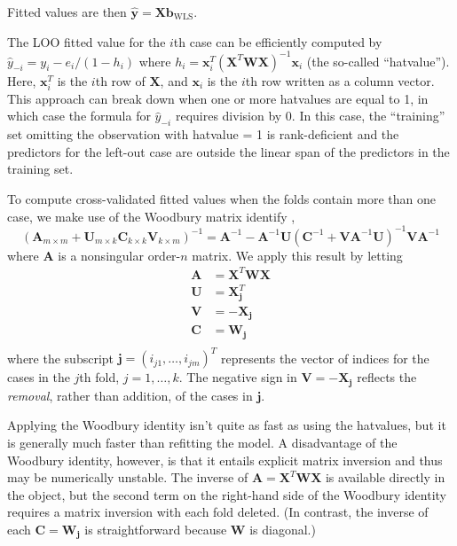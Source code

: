 \documentclass[
]{jss}
\begin{document}
Fitted values are then
\(\widehat{\mathbf{y}} = \mathbf{X}\mathbf{b}_{\mathrm{WLS}}\).

The LOO fitted value for the \(i\)th case can be efficiently computed by
\(\widehat{y}_{-i} = y_i - e_i/(1 - h_i)\) where
\(h_i = \mathbf{x}^T_i \left( \mathbf{X}^T \mathbf{W} \mathbf{X} \right)^{-1} \mathbf{x}_i\)
(the so-called ``hatvalue''). Here, \(\mathbf{x}^T_i\) is the \(i\)th
row of \(\mathbf{X}\), and \(\mathbf{x}_i\) is the \(i\)th row written
as a column vector. This approach can break down when one or more
hatvalues are equal to 1, in which case the formula for
\(\widehat{y}_{-i}\) requires division by 0. In this case, the
``training'' set omitting the observation with hatvalue = 1 is
rank-deficient and the predictors for the left-out case are outside the
linear span of the predictors in the training set.

To compute cross-validated fitted values when the folds contain more
than one case, we make use of the Woodbury matrix identify
\citep{Hager:1989}, \[
\left(\mathbf{A}_{m \times m} + \mathbf{U}_{m \times k} 
\mathbf{C}_{k \times k} \mathbf{V}_{k \times m} \right)^{-1} = \mathbf{A}^{-1} - \mathbf{A}^{-1}\mathbf{U} \left(\mathbf{C}^{-1} + 
\mathbf{VA}^{-1}\mathbf{U} \right)^{-1} \mathbf{VA}^{-1}
\] where \(\mathbf{A}\) is a nonsingular order-\(n\) matrix. We apply
this result by letting \begin{align*}
    \mathbf{A} &= \mathbf{X}^T \mathbf{W} \mathbf{X} \\
    \mathbf{U} &= \mathbf{X}_\mathbf{j}^T \\
    \mathbf{V} &= - \mathbf{X}_\mathbf{j} \\
    \mathbf{C} &= \mathbf{W}_\mathbf{j} \\
\end{align*} where the subscript
\(\mathbf{j} = (i_{j1}, \ldots, i_{jm})^T\) represents the vector of
indices for the cases in the \(j\)th fold, \(j = 1, \ldots, k\). The
negative sign in \(\mathbf{V} = - \mathbf{X}_\mathbf{j}\) reflects the
\emph{removal}, rather than addition, of the cases in \(\mathbf{j}\).

Applying the Woodbury identity isn't quite as fast as using the
hatvalues, but it is generally much faster than refitting the model. A
disadvantage of the Woodbury identity, however, is that it entails
explicit matrix inversion and thus may be numerically unstable. The
inverse of \(\mathbf{A} = \mathbf{X}^T \mathbf{W} \mathbf{X}\) is
available directly in the  object, but the second term on the
right-hand side of the Woodbury identity requires a matrix inversion
with each fold deleted. (In contrast, the inverse of each
\(\mathbf{C} = \mathbf{W}_\mathbf{j}\) is straightforward because
\(\mathbf{W}\) is diagonal.)
\end{document}
